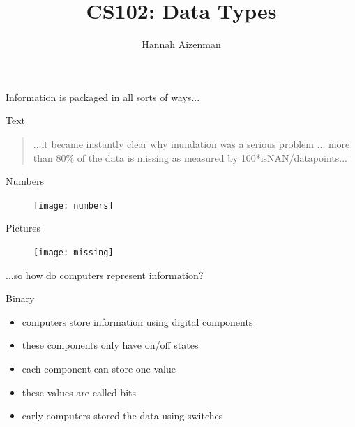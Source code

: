 \documentclass[xcolor={dvipsnames}]{beamer}
\begin{document}
\title{ CS102: Data Types}
\author{Hannah Aizenman}


\begin{frame}
	\titlepage
\end{frame}

\begin{frame}
	\begin{center}
		Information is packaged in all sorts of ways...
	\end{center}
\end{frame}

\begin{frame}{Text}
	\begin{quote}
	 ...it became instantly clear why inundation was a serious problem ... more than 80\% of the data is missing as measured by 100*isNAN/datapoints...
	\end{quote}
\end{frame}

\begin{frame}{Numbers}
	\begin{figure}
			\texttt{[image: numbers]}
	\end{figure}
\end{frame}

\begin{frame}{Pictures}
	\begin{figure}
		\texttt{[image: missing]}
	\end{figure}
\end{frame}

\begin{frame}
	\begin{center}
	...so how do computers represent information?
	\end{center}
\end{frame}

\begin{frame}{Binary}
	\begin{itemize}
		\item computers store information using digital components
		\pause
		\item these components only have on/off states
		\pause
		\item each component can store one value
		\pause
		\item these values are called bits
		\pause
		\item early computers stored the data using switches
	\end{itemize}
\end{frame}
\end{document}
